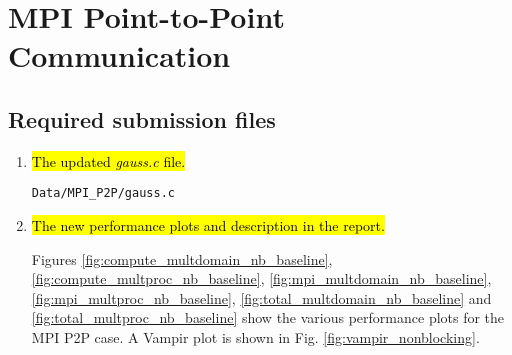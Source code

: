 \section{MPI Point-to-Point Communication}
\subsection{Required submission files}
\begin{enumerate}
	\item \hl{The updated \emph{gauss.c} file.}

		\verb!Data/MPI_P2P/gauss.c!

	\item \hl{The new performance plots and description in the report.}

		Figures \ref{fig:compute_multdomain_nb_baseline}, \ref{fig:compute_multproc_nb_baseline}, \ref{fig:mpi_multdomain_nb_baseline}, \ref{fig:mpi_multproc_nb_baseline}, \ref{fig:total_multdomain_nb_baseline} and \ref{fig:total_multproc_nb_baseline} show the various performance plots for the MPI P2P case. A Vampir plot is shown in Fig. \ref{fig:vampir_nonblocking}.

\end{enumerate}

